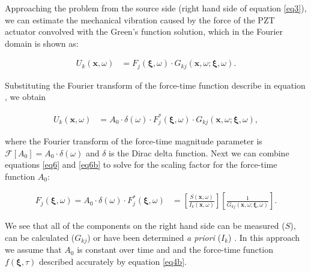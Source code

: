 \documentclass[preprint,3p, 11pt,authoryear]{elsarticle}
\begin{document}
Approaching the problem from the source side (right hand side of equation \eqref{eq3}), we can estimate the mechanical vibration caused by the force of the PZT actuator convolved with the Green's function solution, which in the Fourier domain is shown as:

\begin{equation}
    \label{eq6a}
\begin{split}
U_{k}\left( \mathbf{x}, \omega \right) & = 
       F_{j}\left( \mathbf{\xi}, \omega \right)  \cdot G_{kj}\left(  \mathbf{x}, \omega; \mathbf{\xi}, \omega\right).
\end{split}
\end{equation}

\noindent Substituting the Fourier transform of the force-time function describe in equation , we obtain

\begin{equation}
    \label{eq6b}
\begin{split}
U_{k}\left( \mathbf{x}, \omega \right) & = 
       A_{0}\cdot \delta (\omega)\cdot F^{*}_{j}\left( \mathbf{\xi}, \omega \right)  \cdot G_{kj}\left(  \mathbf{x}, \omega; \mathbf{\xi}, \omega\right),
\end{split}
\end{equation}

\noindent where the Fourier transform of the force-time magnitude parameter is $\mathcal{F}[A_{0}] = A_{0}\cdot\delta(\omega)$ and $\delta$ is the Dirac delta function.  Next we can combine equations \eqref{eq6} and \eqref{eq6b} to solve for the scaling factor for the force-time function $A_{0}$:


\begin{equation}
    \label{eq6c}
\begin{split}
 F_{j}\left( \mathbf{\xi}, \omega \right) = A_{0}\cdot \delta (\omega)  \cdot F^{*}_{j}\left( \mathbf{\xi}, \omega \right) & 
=\left[ \frac{S\left( \mathbf{x}, \omega \right) } 
{ I_{k}\left( \mathbf{x},\omega \right)} \right]
\left[ \frac{1}{ G_{kj}\left(  \mathbf{x}, \omega; \mathbf{\xi}, \omega\right)} \right].
\end{split}
\end{equation}

\noindent We see that all of the components on the right hand side can be measured ($S$), can be calculated ($G_{kj}$) or have been determined \textit{a priori} ($I_{k}$) . In this approach we assume that $A_{0}$ is constant over time and and the force-time function $f(\mathbf{\xi}, \tau)$ described accurately by equation \eqref{eq4b}.
\end{document}
